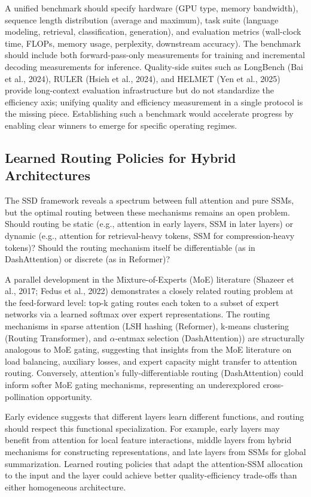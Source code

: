 \documentclass[10pt,twocolumn]{article}
\begin{document}
A unified benchmark should specify hardware (GPU type, memory bandwidth), sequence length distribution (average and maximum), task suite (language modeling, retrieval, classification, generation), and evaluation metrics (wall-clock time, FLOPs, memory usage, perplexity, downstream accuracy). The benchmark should include both forward-pass-only measurements for training and incremental decoding measurements for inference. Quality-side suites such as LongBench (Bai et al., 2024), RULER (Hsieh et al., 2024), and HELMET (Yen et al., 2025) provide long-context evaluation infrastructure but do not standardize the efficiency axis; unifying quality and efficiency measurement in a single protocol is the missing piece. Establishing such a benchmark would accelerate progress by enabling clear winners to emerge for specific operating regimes.

\subsection{Learned Routing Policies for Hybrid Architectures}\label{learned-routing-policies-for-hybrid-architectures}

The SSD framework reveals a spectrum between full attention and pure SSMs, but the optimal routing between these mechanisms remains an open problem. Should routing be static (e.g., attention in early layers, SSM in later layers) or dynamic (e.g., attention for retrieval-heavy tokens, SSM for compression-heavy tokens)? Should the routing mechanism itself be differentiable (as in DashAttention) or discrete (as in Reformer)?

A parallel development in the Mixture-of-Experts (MoE) literature (Shazeer et al., 2017; Fedus et al., 2022) demonstrates a closely related routing problem at the feed-forward level: top-k gating routes each token to a subset of expert networks via a learned softmax over expert representations. The routing mechanisms in sparse attention (LSH hashing (Reformer), k-means clustering (Routing Transformer), and $\alpha$-entmax selection (DashAttention)) are structurally analogous to MoE gating, suggesting that insights from the MoE literature on load balancing, auxiliary losses, and expert capacity might transfer to attention routing. Conversely, attention's fully-differentiable routing (DashAttention) could inform softer MoE gating mechanisms, representing an underexplored cross-pollination opportunity.

Early evidence suggests that different layers learn different functions, and routing should respect this functional specialization. For example, early layers may benefit from attention for local feature interactions, middle layers from hybrid mechanisms for constructing representations, and late layers from SSMs for global summarization. Learned routing policies that adapt the attention-SSM allocation to the input and the layer could achieve better quality-efficiency trade-offs than either homogeneous architecture.
\end{document}
